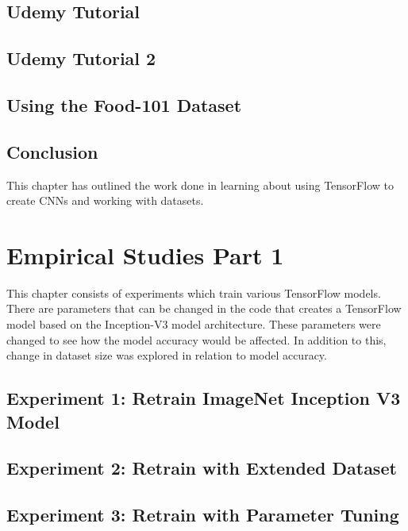 \section{Udemy Tutorial}
\label{udemy1}


\section{Udemy Tutorial 2}
\label{udemy2}


\section{Using the Food-101 Dataset}
\label{food101}


\section{Conclusion}
This chapter has outlined the work done in learning about using TensorFlow to create CNNs and working with datasets.

\chapter{Empirical Studies Part 1}
This chapter consists of experiments which train various TensorFlow models.
There are parameters that can be changed in the code that creates a TensorFlow model based on the Inception-V3 model architecture.
These parameters were changed to see how the model accuracy would be affected.
In addition to this, change in dataset size was explored in relation to model accuracy.

\section{Experiment 1: Retrain ImageNet Inception V3 Model}
\label{inception}


\section{Experiment 2: Retrain with Extended Dataset}
\label{extended}


\section{Experiment 3: Retrain with Parameter Tuning}
\label{parameterTuning}


